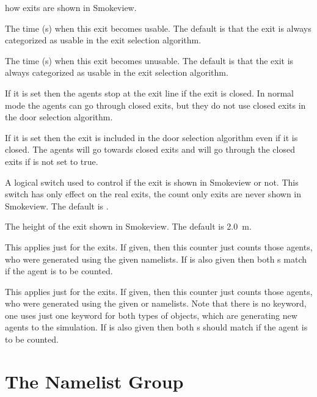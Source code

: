 \documentclass[12pt,a4paper,final,twoside]{stylevk}
\begin{document}
\begin{description}
  how exits are shown in Smokeview.
%
\item[\Timts{TIME\_OPEN}] The time (s) when this exit becomes usable.
  The default is that the exit is always categorized as usable in the
  exit selection algorithm.
%
\item[\Timts{TIME\_CLOSE}] The time (s) when this exit becomes
  unusable.  The default is that the exit is always categorized as
  usable in the exit selection algorithm.
%
\item[\Timts{LOCKED\_WHEN\_CLOSED}] If it is set  then the agents stop at the exit line if the exit is closed. In normal mode the agents can go through closed exits, but they do not use closed exits in the door selection algorithm.
%
\item[\Timts{TARGET\_WHEN\_CLOSED}] If it is set  then the exit is included in the door selection algorithm even if it is closed. The agents will go towards closed exits and will go through the closed exits if  is not set to true.
%
\item[\Timts{SHOW}] A logical switch used to control if the exit is
  shown in Smokeview or not.  This switch has only effect on the real
  exits, the count only exits are never shown in Smokeview.  The
  default is .
%
\item[\Timts{HEIGHT}] The height of the exit shown in Smokeview.  The
  default is 2.0~m.
%
\item[\Timts{PERS\_ID}] This applies just for the  exits.  If given, then this counter just counts those
  agents, who were generated using the given  namelists.
  If  is also given then both s match if the agent
  is to be counted.
%
\item[\Timts{EVAC\_ID}] This applies just for the  exits.  If given, then this counter just counts those
  agents, who were generated using the given  or
   namelists.  Note that there is no 
  keyword, one uses just one keyword for both types of objects, which
  are generating new agents to the simulation.  If  is
  also given then both s should match if the agent is to be counted.
%
\end{description}


\section{The  Namelist Group}\label{Sec_EntrNML}
\end{document}
